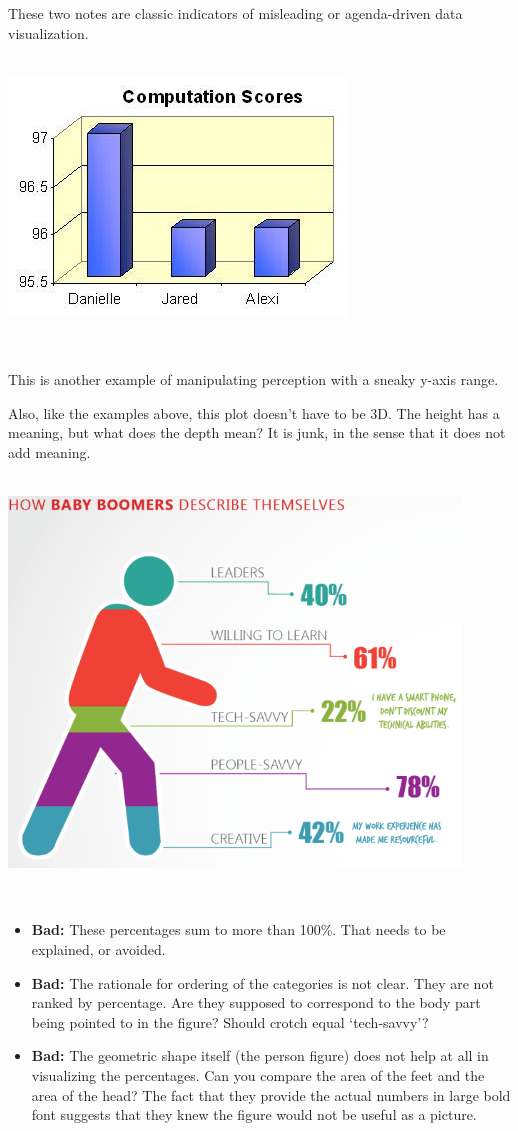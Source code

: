 \documentclass[
]{book}
\begin{document}
These two notes are classic indicators of misleading or agenda-driven data visualization.

~\\

\includegraphics{img/vis12.jpg}

~

This is another example of manipulating perception with a sneaky y-axis range.

Also, like the examples above, this plot doesn't have to be 3D. The height has a meaning, but what does the depth mean? It is junk, in the sense that it does not add meaning.

~\\

\includegraphics[width=0.9\textwidth,height=\textheight]{img/vis12.png}

~

\begin{itemize}
\item
  \textbf{Bad:} These percentages sum to more than 100\%. That needs to be explained, or avoided.
\item
  \textbf{Bad:} The rationale for ordering of the categories is not clear. They are not ranked by percentage. Are they supposed to correspond to the body part being pointed to in the figure? Should crotch equal `tech-savvy'?
\item
  \textbf{Bad:} The geometric shape itself (the person figure) does not help at all in visualizing the percentages. Can you compare the area of the feet and the area of the head? The fact that they provide the actual numbers in large bold font suggests that they knew the figure would not be useful as a picture.
\end{itemize}
\end{document}
